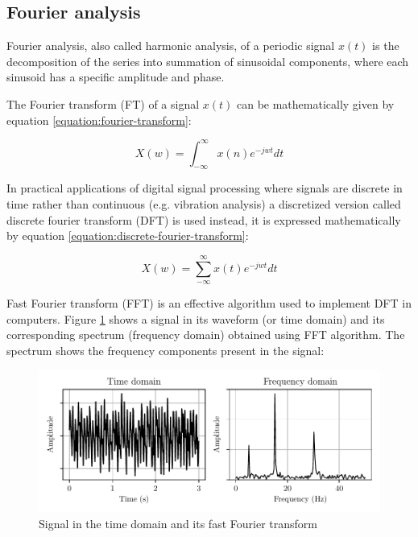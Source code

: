 \subsection{Fourier analysis}
Fourier analysis, also called harmonic analysis, of a periodic signal $x(t)$ is the decomposition of the series into summation of sinusoidal components, where each sinusoid has a specific amplitude and phase.

The Fourier transform (FT) of a signal $x(t)$ can be mathematically given by equation \ref{equation:fourier-transform}:

\begin{equation}
    X(w) = \int_{-\infty}^{\infty}x(n)e^{-jwt}dt
    \label{equation:fourier-transform}
\end{equation}

In practical applications of digital signal processing where signals are discrete in time rather than continuous (e.g. vibration analysis) a discretized version called discrete fourier transform (DFT) is used instead, it is expressed mathematically by equation \ref{equation:discrete-fourier-transform}:

\begin{equation}
    X(w) = \sum_{-\infty}^{\infty}x(t)e^{-jwt}dt
    \label{equation:discrete-fourier-transform}
\end{equation}

Fast Fourier transform (FFT) is an effective algorithm used to implement DFT in computers. Figure \ref{figure:fft} shows a signal in its waveform (or time domain) and its corresponding spectrum (frequency domain) obtained using FFT algorithm. The spectrum shows the frequency components present in the signal:

\begin{figure}[H]
    \centering
    \includegraphics{figures/fft.pdf}
    \caption{Signal in the time domain and its fast Fourier transform}
    \label{figure:fft}
\end{figure}

